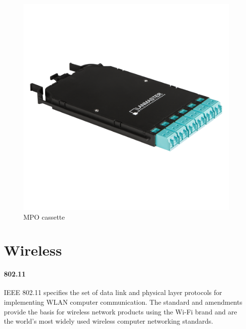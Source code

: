 \begin{figure}
   \centering
   \includegraphics[width=\textwidth]{images/physical/mpo-cassette.png}
   \caption{\acs{MPO} cassette}
   \label{fig:mpo-cassette}
\end{figure}






\section{Wireless}
\label{sec:wireless}

\paragraph{802.11}
\acs{IEEE} 802.11 specifies the set of %
data link and physical layer protocols for implementing \acf{WLAN} computer communication.
The standard and amendments provide the basis for wireless network products using the Wi-Fi brand and are the world's most widely used wireless computer networking standards.

